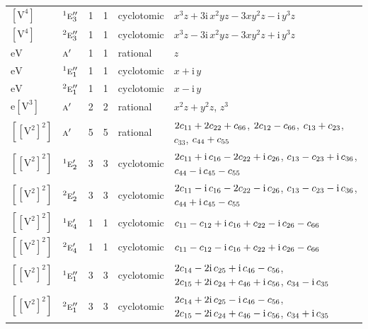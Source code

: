 \documentclass[10pt,a4paper]{article}
\numberwithin{equation}{section}
\newcommand{\irr}[1]{\text{\normalfont\scshape #1}}
\newcommand{\conjpair}[1]{{}^{#1}}
\newcommand{\iunit}{\mathrm{i}}
\newcommand{\jahn}[1]{\mathrm{#1}}
\newlength{\fillwidth}\newlength{\cellwidth}\newlength{\colwidth}
\newcommand{\signbreak}{\penalty100\relax}
\begin{document}
{\begin{longtable}{@{}llrrl>{\RaggedRight\arraybackslash}p{\fillwidth}@{}}
$\jahn{[V^{4}]}$ & $\conjpair{1}\irr{e}_{3}''$ & 1 & 1 & cyclotomic & $x^{3}z + 3\iunit{}\,x^{2}yz - 3xy^{2}z - \iunit{}\,y^{3}z$\\
$\jahn{[V^{4}]}$ & $\conjpair{2}\irr{e}_{3}''$ & 1 & 1 & cyclotomic & $x^{3}z - 3\iunit{}\,x^{2}yz - 3xy^{2}z + \iunit{}\,y^{3}z$\\
$\jahn{eV}$ & $\irr{a}'$ & 1 & 1 & rational & $z$\\
$\jahn{eV}$ & $\conjpair{1}\irr{e}_{1}''$ & 1 & 1 & cyclotomic & $x + \iunit{}\,y$\\
$\jahn{eV}$ & $\conjpair{2}\irr{e}_{1}''$ & 1 & 1 & cyclotomic & $x - \iunit{}\,y$\\
$\jahn{e[V^{3}]}$ & $\irr{a}'$ & 2 & 2 & rational & $x^{2}z + y^{2}z$, $z^{3}$\\
$\jahn{[[V^{2}]^{2}]}$ & $\irr{a}'$ & 5 & 5 & rational & $2c_{11} +\signbreak 2c_{22} +\signbreak c_{66}$, $2c_{12} -\signbreak c_{66}$, $c_{13} +\signbreak c_{23}$, $c_{33}$, $c_{44} +\signbreak c_{55}$\\
$\jahn{[[V^{2}]^{2}]}$ & $\conjpair{1}\irr{e}_{2}'$ & 3 & 3 & cyclotomic & $2c_{11} +\signbreak \iunit{}\,c_{16} -\signbreak 2c_{22} +\signbreak \iunit{}\,c_{26}$, $c_{13} -\signbreak c_{23} +\signbreak \iunit{}\,c_{36}$, $c_{44} -\signbreak \iunit{}\,c_{45} -\signbreak c_{55}$\\
$\jahn{[[V^{2}]^{2}]}$ & $\conjpair{2}\irr{e}_{2}'$ & 3 & 3 & cyclotomic & $2c_{11} -\signbreak \iunit{}\,c_{16} -\signbreak 2c_{22} -\signbreak \iunit{}\,c_{26}$, $c_{13} -\signbreak c_{23} -\signbreak \iunit{}\,c_{36}$, $c_{44} +\signbreak \iunit{}\,c_{45} -\signbreak c_{55}$\\
$\jahn{[[V^{2}]^{2}]}$ & $\conjpair{1}\irr{e}_{4}'$ & 1 & 1 & cyclotomic & $c_{11} -\signbreak c_{12} +\signbreak \iunit{}\,c_{16} +\signbreak c_{22} -\signbreak \iunit{}\,c_{26} -\signbreak c_{66}$\\
$\jahn{[[V^{2}]^{2}]}$ & $\conjpair{2}\irr{e}_{4}'$ & 1 & 1 & cyclotomic & $c_{11} -\signbreak c_{12} -\signbreak \iunit{}\,c_{16} +\signbreak c_{22} +\signbreak \iunit{}\,c_{26} -\signbreak c_{66}$\\
$\jahn{[[V^{2}]^{2}]}$ & $\conjpair{1}\irr{e}_{1}''$ & 3 & 3 & cyclotomic & $2c_{14} -\signbreak 2\iunit{}\,c_{25} +\signbreak \iunit{}\,c_{46} -\signbreak c_{56}$, $2c_{15} +\signbreak 2\iunit{}\,c_{24} +\signbreak c_{46} +\signbreak \iunit{}\,c_{56}$, $c_{34} -\signbreak \iunit{}\,c_{35}$\\
$\jahn{[[V^{2}]^{2}]}$ & $\conjpair{2}\irr{e}_{1}''$ & 3 & 3 & cyclotomic & $2c_{14} +\signbreak 2\iunit{}\,c_{25} -\signbreak \iunit{}\,c_{46} -\signbreak c_{56}$, $2c_{15} -\signbreak 2\iunit{}\,c_{24} +\signbreak c_{46} -\signbreak \iunit{}\,c_{56}$, $c_{34} +\signbreak \iunit{}\,c_{35}$\\

\end{longtable}}
\end{document}
